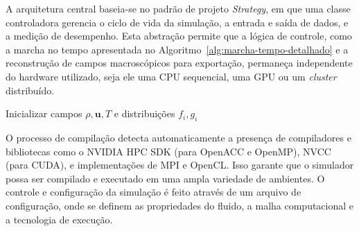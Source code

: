 A arquitetura central baseia-se no padrão de projeto \textit{Strategy}, em que uma classe controladora gerencia o ciclo de vida da simulação, a entrada e saída de dados, e a medição de desempenho.
Esta abstração permite que a lógica de controle, como a marcha no tempo apresentada no Algoritmo~\ref{alg:marcha-tempo-detalhado} e a reconstrução de campos macroscópicos para exportação, permaneça independente do hardware utilizado, seja ele uma CPU sequencial, uma GPU ou um \textit{cluster} distribuído.
\begin{algorithm}[ht]
    \caption{Marcha no Tempo para LBM Compressível com Acoplamento Térmico}\label{alg:marcha-tempo-detalhado}
    Inicializar campos $\rho, \mathbf{u}, T$ e distribuições $f_i, g_i$\;
\end{algorithm}

O processo de compilação detecta automaticamente a presença de compiladores e bibliotecas como o NVIDIA HPC SDK (para OpenACC e OpenMP), NVCC (para CUDA), e implementações de MPI e OpenCL. Isso garante que o simulador possa ser compilado e executado em uma ampla variedade de ambientes.
O controle e configuração da simulação é feito através de um arquivo de configuração, onde se definem as propriedades do fluido, a malha computacional e a tecnologia de execução.

